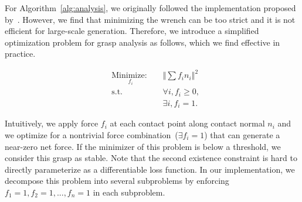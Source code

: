 For Algorithm~\ref{alg:analysis}, we originally followed the implementation proposed by~\cite{khandate2023sampling}. However, we find that minimizing the wrench can be too strict and it is not efficient for large-scale generation. Therefore, we introduce a simplified optimization problem for grasp analysis as follows, which we find effective in practice.
\begin{tcolorbox}[colback=black!5!white, colframe=black!75!black, 
    boxsep=5pt, %
    left=5pt, %
    right=5pt, %
    top=3pt, %
    bottom=3pt, %
    title=Net Force Optimization $(\{n_i\})$, %
    fonttitle=\bfseries, %
    coltitle=white, %
]
\[
\begin{aligned}
    &\underset{f_i}{\text{Minimize: }}  && \left\Vert\sum f_in_i\right\Vert^2 \\
    &\text{s.t. } && \forall i, f_i\geq 0, \\
    &                   && \exists i,  f_i = 1.
\end{aligned}
\]
\end{tcolorbox}
Intuitively, we apply force $f_i$ at each contact point along contact normal $n_i$ and we optimize for a nontrivial force combination~($\exists f_i=1$) that can generate a near-zero net force. If the minimizer of this problem is below a threshold, we consider this grasp as stable. Note that the second existence constraint is hard to directly parameterize as a differentiable loss function. In our implementation, we decompose this problem into several subproblems by enforcing $f_1=1, f_2=1, ..., f_n=1$ in each subproblem.

